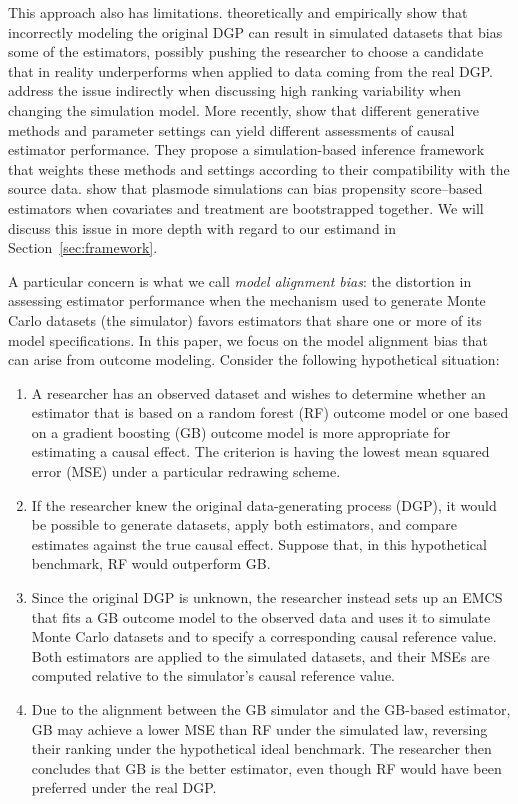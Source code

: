 This approach also has limitations.  theoretically and empirically show that incorrectly modeling the original DGP can result in simulated datasets that bias some of the estimators, possibly pushing the researcher to choose a candidate that in reality underperforms when applied to data coming from the real DGP.  address the issue indirectly when discussing high ranking variability when changing the simulation model. More recently,  show that different generative methods and parameter settings can yield different assessments of causal estimator performance. They propose a simulation-based inference framework that weights these methods and settings according to their compatibility with the source data.  show that plasmode simulations can bias propensity score--based estimators when covariates and treatment are bootstrapped together. We will discuss this issue in more depth with regard to our estimand in Section~\ref{sec:framework}.

A particular concern is what we call \emph{model alignment bias}: the distortion in assessing estimator performance when the mechanism used to generate Monte Carlo datasets (the simulator) favors estimators that share one or more of its model specifications. In this paper, we focus on the model alignment bias that can arise from outcome modeling. Consider the following hypothetical situation:

\begin{enumerate}
    \item A researcher has an observed dataset and wishes to determine whether an estimator that is based on a random forest (RF) outcome model or one based on a gradient boosting (GB) outcome model is more appropriate for estimating a causal effect. The criterion is having the lowest mean squared error (MSE) under a particular redrawing scheme.

    \item If the researcher knew the original data-generating process (DGP), it would be possible to generate datasets, apply both estimators, and compare estimates against the true causal effect. Suppose that, in this hypothetical benchmark, RF would outperform GB.

    \item Since the original DGP is unknown, the researcher instead sets up an EMCS that fits a GB outcome model to the observed data and uses it to simulate Monte Carlo datasets and to specify a corresponding causal reference value. Both estimators are applied to the simulated datasets, and their MSEs are computed relative to the simulator's causal reference value.

    \item Due to the alignment between the GB simulator and the GB-based estimator, GB may achieve a lower MSE than RF under the simulated law, reversing their ranking under the hypothetical ideal benchmark. The researcher then concludes that GB is the better estimator, even though RF would have been preferred under the real DGP.
\end{enumerate}

